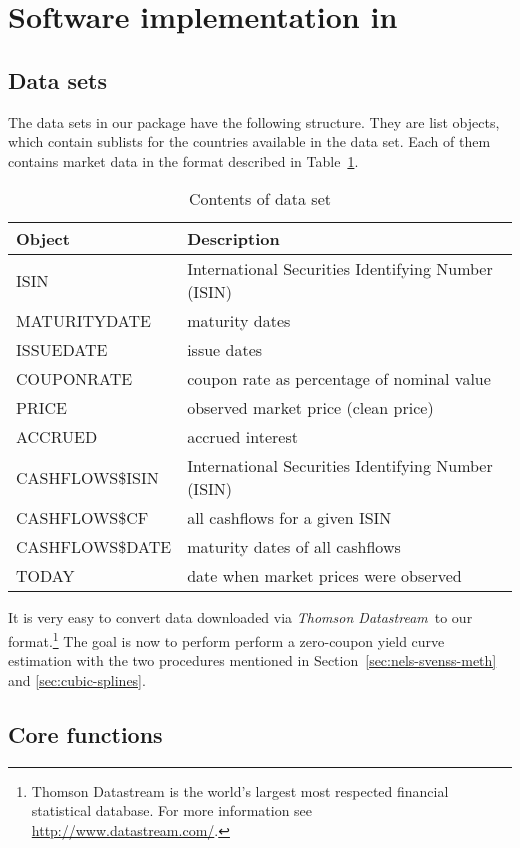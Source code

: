 \section[Software implementation in R]{Software implementation in }
\label{sec:soft-impl}

\subsection{Data sets}

The data sets in our package have the following structure. They are list objects, which contain sublists for the countries available in the data set. Each of them contains market data in the format described in Table~\ref{tab:dataset}.

\begin{table}[htb]
  \centering
  \begin{tabular}[htb]{ll}
\hline
    \textbf{Object} & \textbf{Description} \\
\hline
ISIN & International Securities Identifying Number (ISIN)\\
MATURITYDATE & maturity dates\\
ISSUEDATE & issue dates\\
COUPONRATE & coupon rate as percentage of nominal value\\
PRICE & observed market price (clean price)\\
ACCRUED & accrued interest\\
CASHFLOWS\$ISIN & International Securities Identifying Number (ISIN)\\
CASHFLOWS\$CF & all cashflows for a given ISIN\\
CASHFLOWS\$DATE & maturity dates of all cashflows\\
TODAY & date when market prices were observed\\
\hline  
\end{tabular}
  \caption{Contents of data set}
\label{tab:dataset}
\end{table}

It is very easy to convert data downloaded via \emph{Thomson Datastream}\texttrademark\, to our format.\footnote{Thomson Datastream is the world's largest most respected financial statistical database. For more information see \url{http://www.datastream.com/}.} The goal is now to perform perform a zero-coupon yield curve estimation with the two procedures mentioned in Section~\ref{sec:nels-svenss-meth} and \ref{sec:cubic-splines}.

\subsection{Core functions}
\label{sec:main-functions}

